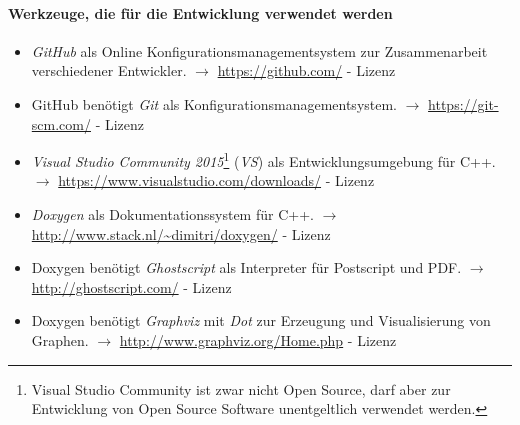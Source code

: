 \documentclass[english,ngerman,parskip=half,headsepline,footsepline]{scrreprt}
\newcounter{Enumi}
\begin{document}
	\paragraph{Werkzeuge, die für die Entwicklung verwendet werden}
	\begin{itemize}
		\setcounter{enumi}{\value{Enumi}}

		\item\label{Werkzeug:GitHub}\emph{GitHub} als Online Konfigurationsmanagementsystem zur Zusammenarbeit verschiedener Entwickler. $\rightarrow$ \url{https://github.com/} - Lizenz~\cite{bib:GPLii}

		\item\label{Werkzeug:Git}GitHub benötigt \emph{Git} als Konfigurationsmanagementsystem. $\rightarrow$ \url{https://git-scm.com/} - Lizenz~\cite{bib:GPLii}

		\item\label{Werkzeug:VSC}\emph{Visual Studio Community 2015}\footnote{ Visual Studio Community ist zwar nicht Open Source, darf aber zur Entwicklung von Open Source Software unentgeltlich verwendet werden.} (\emph{VS}) als Entwicklungsumgebung für C++. $\rightarrow$ \url{https://www.visualstudio.com/downloads/} - Lizenz~\cite{bib:EULA}

		\item\label{Werkzeug:Doxygen}\emph{Doxygen} als Dokumentationssystem für C++. $\rightarrow$ \url{http://www.stack.nl/~dimitri/doxygen/} - Lizenz~\cite{bib:GPLii}

		\item\label{Werkzeug:Ghostscript}Doxygen benötigt \emph{Ghostscript} als Interpreter für Postscript und PDF. $\rightarrow$ \url{http://ghostscript.com/} - Lizenz~\cite{bib:AGPL}

		\item\label{Werkzeug:Graphviz}Doxygen benötigt \emph{Graphviz} mit \emph{Dot} zur Erzeugung und Visualisierung von Graphen. $\rightarrow$ \url{http://www.graphviz.org/Home.php} - Lizenz~\cite{bib:EPL}

		\setcounter{Enumi}{\value{enumi}}
	\end{itemize}
\end{document}
